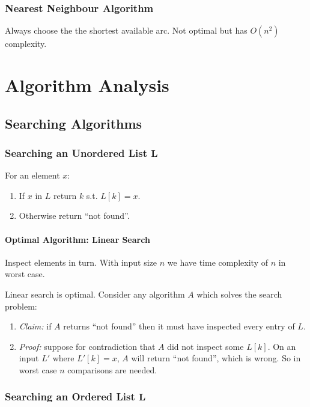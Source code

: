 \documentclass[twocolumn,english]{article}
\begin{document}
\subsubsection{Nearest Neighbour Algorithm}

Always choose the the shortest available arc. Not optimal but has
$O\left(n^{2}\right)$ complexity.


\section{Algorithm Analysis}


\subsection{Searching Algorithms}


\subsubsection{Searching an Unordered List $\boldsymbol{L}$}

For an element $x$:
\begin{enumerate}
\item If $x$ in $L$ return $k$ s.t. $L\left[k\right]=x$.
\item Otherwise return ``not found''.
\end{enumerate}

\paragraph{Optimal Algorithm: Linear Search}

Inspect elements in turn. With input size $n$ we have time complexity
of $n$ in worst case.

Linear search is optimal. Consider any algorithm $A$ which solves
the search problem:
\begin{enumerate}
\item \emph{Claim:} if $A$ returns ``not found'' then it must have inspected
every entry of $L$.
\item \emph{Proof:} suppose for contradiction that $A$ did not inspect
some $L\left[k\right]$. On an input $L'$ where $L'\left[k\right]=x$,
$A$ will return ``not found'', which is wrong. So in worst case
$n$ comparisons are needed.
\end{enumerate}

\subsubsection{Searching an Ordered List $\boldsymbol{L}$}
\end{document}
